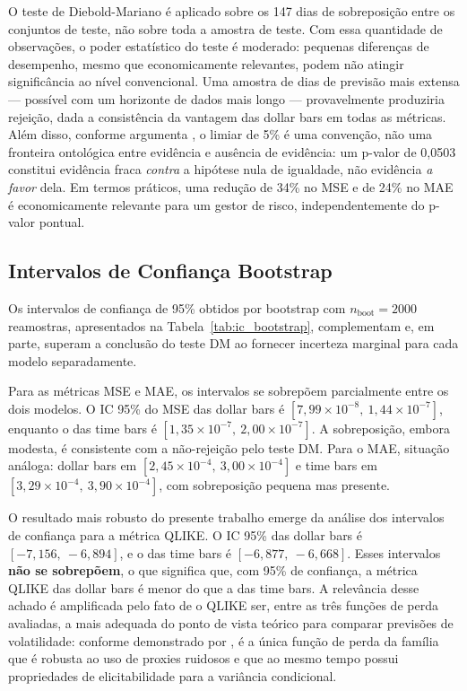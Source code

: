 O teste de Diebold-Mariano é aplicado sobre os 147 dias de sobreposição entre os conjuntos
de teste, não sobre toda a amostra de teste. Com essa quantidade de observações, o poder
estatístico do teste é moderado: pequenas diferenças de desempenho, mesmo que economicamente
relevantes, podem não atingir significância ao nível convencional. Uma amostra de dias de
previsão mais extensa — possível com um horizonte de dados mais longo — provavelmente
produziria rejeição, dada a consistência da vantagem das dollar bars em todas as métricas.
Além disso, conforme argumenta \citet{Diebold2015}, o limiar de 5\% é uma convenção, não
uma fronteira ontológica entre evidência e ausência de evidência: um p-valor de 0,0503
constitui evidência fraca \textit{contra} a hipótese nula de igualdade, não evidência
\textit{a favor} dela. Em termos práticos, uma redução de 34\% no MSE e de 24\% no MAE
é economicamente relevante para um gestor de risco, independentemente do p-valor pontual.

\subsection{Intervalos de Confiança Bootstrap}
\label{subsec:bootstrap}

Os intervalos de confiança de 95\% obtidos por bootstrap com $n_{\text{boot}} = 2000$
reamostras, apresentados na Tabela~\ref{tab:ic_bootstrap}, complementam e, em parte,
superam a conclusão do teste DM ao fornecer incerteza marginal para cada modelo
separadamente.

Para as métricas MSE e MAE, os intervalos se sobrepõem parcialmente entre os dois modelos.
O IC 95\% do MSE das dollar bars é $[7{,}99 \times 10^{-8},\ 1{,}44 \times 10^{-7}]$,
enquanto o das time bars é $[1{,}35 \times 10^{-7},\ 2{,}00 \times 10^{-7}]$. A sobreposição,
embora modesta, é consistente com a não-rejeição pelo teste DM. Para o MAE, situação análoga:
dollar bars em $[2{,}45 \times 10^{-4},\ 3{,}00 \times 10^{-4}]$ e time bars em
$[3{,}29 \times 10^{-4},\ 3{,}90 \times 10^{-4}]$, com sobreposição pequena mas presente.

O resultado mais robusto do presente trabalho emerge da análise dos intervalos de
confiança para a métrica QLIKE. O IC 95\% das dollar bars é $[-7{,}156,\ -6{,}894]$,
e o das time bars é $[-6{,}877,\ -6{,}668]$. Esses intervalos \textbf{não se sobrepõem},
o que significa que, com 95\% de confiança, a métrica QLIKE das dollar bars é menor do
que a das time bars. A relevância desse achado é amplificada pelo fato de o QLIKE ser,
entre as três funções de perda avaliadas, a mais adequada do ponto de vista teórico para
comparar previsões de volatilidade: conforme demonstrado por \citet{Patton2011}, é a
única função de perda da família que é robusta ao uso de proxies ruidosos e que ao mesmo
tempo possui propriedades de elicitabilidade para a variância condicional.

